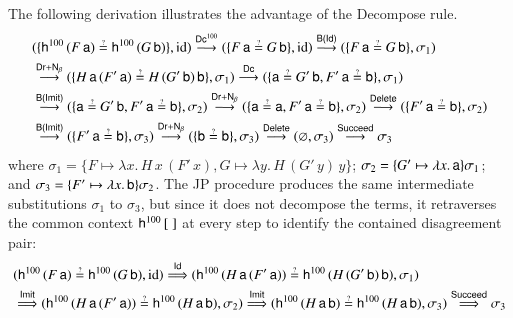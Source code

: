 \begin{exa}
The following derivation illustrates the advantage of the \textsf{Decompose} rule.
\begin{align*}
&
(\{\cst{h}^{100} \, (F \, \cst{a}) \unif \cst{h}^{100} \, (G \,\cst{b})\}, \makeop{id}) 
\overset{\textsf{Dc}^{100}}{\newunifarrow}
(\{F \, \cst{a} \unif G \,\cst{b}\}, \makeop{id}) 
\overset{\textsf{B(Id)}}{\newunifarrow}
(\{F \, \cst{a} \unif G \,\cst{b}\}, \sigma_1) 
\\ &
\overset{\textsf{Dr}+\textsf{N}_\beta}{\newunifarrow}
(\{H \, \cst{a}\, (F' \, \cst{a}) \unif H \, (G'\,\cst{b}) \,\cst{b}\}, \sigma_1)
\overset{\textsf{Dc}}{\newunifarrow}
(\{\cst{a} \unif G'\,\cst{b}, F' \, \cst{a} \unif \cst{b}\}, \sigma_1) 
\\ &
\overset{\textsf{B(Imit)}}{\newunifarrow}
(\{\cst{a} \unif G'\,\cst{b}, F' \, \cst{a} \unif \cst{b}\}, \sigma_2) 
\overset{\textsf{Dr}+\textsf{N}_\beta}{\newunifarrow}
(\{\cst{a} \unif \cst{a}, F' \, \cst{a} \unif \cst{b}\}, \sigma_2) 
\overset{\textsf{Delete}}{\newunifarrow}
(\{F' \, \cst{a} \unif \cst{b}\}, \sigma_2) \\
&\overset{\textsf{B(Imit)}}{\newunifarrow}
(\{F' \, \cst{a} \unif \cst{b}\}, \sigma_3) 
\overset{\textsf{Dr}+\textsf{N}_\beta}{\newunifarrow}
(\{\cst{b} \unif \cst{b}\}, \sigma_3) 
\overset{\textsf{Delete}}{\newunifarrow}
(\varnothing, \sigma_3) 
\overset{\textsf{Succeed}}{\newunifarrow}
\sigma_3 
\end{align*}
where 
$\sigma_1 = \{
    F\mapsto \lambda x. \, H \, x\, (F' \, x), 
    G\mapsto \lambda y. \, H \, (G' \, y) \, y
    \}$;
$\sigma_2 = \{
  G' \mapsto \lambda x. \, \mathsf{a}
  \}\sigma_1$; and
$\sigma_3 = \{
  F' \mapsto \lambda x. \, \mathsf{b}
  \}\sigma_2$.
%
The JP procedure produces the same intermediate substitutions $\sigma_1$ to $\sigma_3$,
but since it does not decompose the terms, it retraverses the common context
$\mathsf{h}^{100}\,[\;]$ at every step to identify the contained disagreement pair:
\begin{align*}
    &
    (\cst{h}^{100} \, (F \, \cst{a}) \unif \cst{h}^{100} \, (G \,\cst{b}), \makeop{id}) 
    \overset{\textsf{Id}}{\jpunifarrow}
    (\cst{h}^{100} \, (H \, \cst{a}\, (F' \, \cst{a})) \unif \cst{h}^{100} \, (H \, (G' \,\cst{b}) \,\cst{b}), \sigma_1) 
    \\ &
    \overset{\textsf{Imit}}{\jpunifarrow}
    (\cst{h}^{100} \, (H \, \cst{a}\, (F' \, \cst{a})) \unif \cst{h}^{100} \, (H \, \cst{a} \,\cst{b}), \sigma_2) 
    \overset{\textsf{Imit}}{\jpunifarrow}
    (\cst{h}^{100} \, (H \, \cst{a}\, \cst{b}) \unif \cst{h}^{100} \, (H \, \cst{a} \,\cst{b}), \sigma_3) 
    \overset{\textsf{Succeed}}{\jpunifarrow}
    \sigma_3
\end{align*}

\end{exa}

